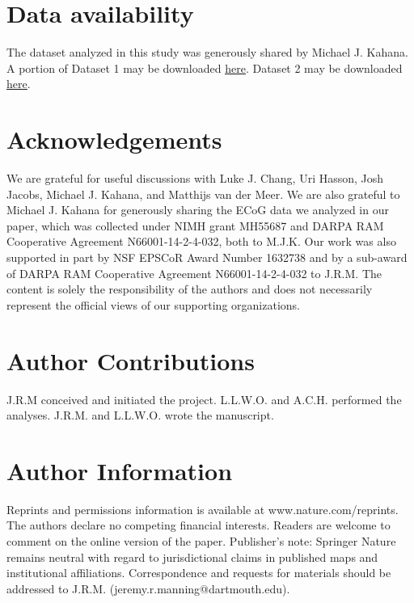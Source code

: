 \documentclass[11pt]{article}
\begin{document}
\section*{Data availability}
The dataset analyzed in this study was generously shared by Michael
J. Kahana.  A portion of Dataset 1 may be downloaded
\href{http://memory.psych.upenn.edu/Request_EEG_access?paper=SedeEtal03}{\underline{here}}.
Dataset 2 may be downloaded
\href{http://memory.psych.upenn.edu/Request_EEG_access?paper=EzzyEtal17}{\underline{here}}.

\section*{Acknowledgements}
We are grateful for useful discussions with Luke J. Chang, Uri Hasson,
Josh Jacobs, Michael J. Kahana, and Matthijs van der Meer.  We are
also grateful to Michael J. Kahana for generously sharing the ECoG
data we analyzed in our paper, which was collected under NIMH grant
MH55687 and DARPA RAM Cooperative Agreement N66001-14-2-4-032, both to
M.J.K.  Our work was also supported in part by NSF EPSCoR Award Number
1632738 and by a sub-award of DARPA RAM Cooperative Agreement
N66001-14-2-4-032 to J.R.M.  The content is solely the responsibility
of the authors and does not necessarily represent the official views
of our supporting organizations.

\section*{Author Contributions}
J.R.M conceived and initiated the project. L.L.W.O. and
A.C.H. performed the analyses. J.R.M. and L.L.W.O. wrote the
manuscript.

\section*{Author Information}
Reprints and permissions information is available at www.nature.com/reprints.  The authors declare no competing financial interests.  Readers are welcome to comment on the online version of the paper.  Publisher's note: Springer Nature remains neutral with regard to jurisdictional claims in published maps and institutional affiliations.  Correspondence and requests for materials should be addressed to J.R.M. (jeremy.r.manning@dartmouth.edu).




\clearpage
\end{document}
